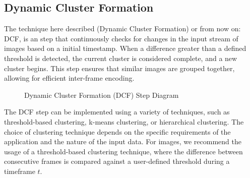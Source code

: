 \documentclass[twocolumn]{article}
\begin{document}
\subsection{Dynamic Cluster Formation}
The technique here described (Dynamic Cluster Formation) or from now on: DCF, is an step that continuously checks for changes in the input stream of images based on a initial timestamp. When a difference greater than a defined threshold is detected, the current cluster is considered complete, and a new cluster begins. This step ensures that similar images are grouped together, allowing for efficient inter-frame encoding.

\begin{figure}[!hb]
    \centering
    \caption{Dynamic Cluster Formation (DCF) Step Diagram}
    \label{fig:figure1}
\end{figure}

The DCF step can be implemented using a variety of techniques, such as threshold-based clustering, k-means clustering, or hierarchical clustering. The choice of clustering technique depends on the specific requirements of the application and the nature of the input data. For images, we recommend the usage of a threshold-based clustering technique, where the difference between consecutive frames is compared against a user-defined threshold during a timeframe $t$.
\end{document}
